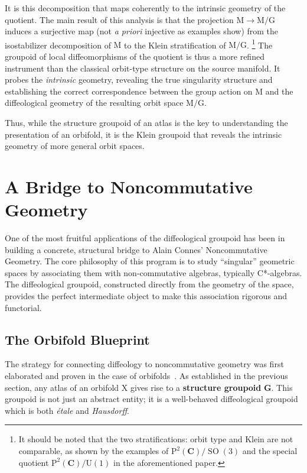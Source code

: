 \documentclass[10pt,reqno,letterpaper,twoside]{amsart}
\theoremstyle{article}
\newcommand{\CC}{\mathbf{C}}
\newcommand{\GG}{\mathbf{G}}
\def \G{\mathrm G}
\def \M{\mathrm M}
\def \P{\mathrm P}
\def \U{\mathrm U}
\def \X{\mathrm X}
\DeclareMathOperator{\SO}{SO}
\begin{document}
  It is this decomposition that maps coherently to the intrinsic geometry of the quotient.
  The main result of this analysis is that the projection $\M \to \M/\G$ induces a surjective map
  (not \emph{a priori} injective as examples show)
  from the isostabilizer decomposition of $\M$ to the Klein stratification of $\M/\G$.%
  \footnote{It should be noted that the two stratifications: orbit type and Klein are not comparable,
  as shown by the examples of $\P^2(\CC)/\SO(3)$ and the special quotient $\P^2(\CC)/\U(1)$ in the aforementioned paper.}
  The groupoid of local diffeomorphisms of the quotient is thus a more refined instrument than the classical orbit-type structure on the source manifold.
  It probes the \emph{intrinsic} geometry,
  revealing the true singularity structure and establishing the correct correspondence between the group action on $\M$ and the diffeological geometry of the resulting orbit space $\M/\G$.
  
  Thus,
  while the structure groupoid of an atlas is the key to understanding the presentation of an orbifold,
  it is the Klein groupoid that reveals the intrinsic geometry of more general orbit spaces.
  
  
  \section{A Bridge to Noncommutative Geometry}
  
  One of the most fruitful applications of the diffeological groupoid has been in building a concrete,
  structural bridge to Alain Connes' Noncommutative Geometry.
  The core philosophy of this program is to study ``singular'' geometric spaces by associating them with non-commutative algebras,
  typically C*-algebras.
  The diffeological groupoid,
  constructed directly from the geometry of the space,
  provides the perfect intermediate object to make this association rigorous and functorial.
  
  \subsection{The Orbifold Blueprint}
  
  The strategy for connecting diffeology to noncommutative geometry was first elaborated and proven in the case of orbifolds~\cite{IZL18}.
  As established in the previous section,
  any atlas of an orbifold $\X$ gives rise to a \textbf{structure groupoid} $\GG$.
  This groupoid is not just an abstract entity;
  it is a well-behaved diffeological groupoid which is both \emph{étale} and \emph{Hausdorff}.
  
\end{document}
